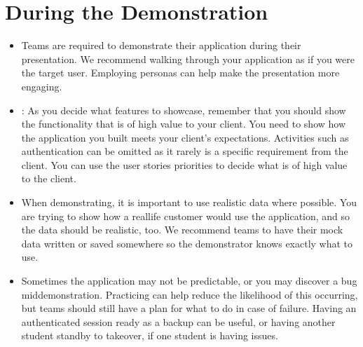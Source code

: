 \documentclass[letterpaper,10pt,english]{jupyterBook}
\begin{document}
\section{During the Demonstration}
\label{\detokenize{chapter_14/final_presentation:during-the-demonstration}}\begin{itemize}
\item {} 
\sphinxAtStartPar
{} Teams are
required to demonstrate their application during their presentation.
We recommend walking through your application as if you were the
target user. Employing personas can help make the presentation more
engaging.

\item {} 
\sphinxAtStartPar
{}: As you decide what features to
showcase, remember that you should show the functionality that is of
high value to your client. You need to show how the application you
built meets your client’s expectations. Activities such as
authentication can be omitted as it rarely is a specific requirement
from the client. You can use the user stories priorities to decide
what is of high value to the client.

\item {} 
\sphinxAtStartPar
{} When demonstrating, it is important to use
realistic data where possible. You are trying to show how a
real\sphinxhyphen{}life customer would use the application, and so the data should
be realistic, too. We recommend teams to have their mock data
written or saved somewhere so the demonstrator knows exactly what to
use.

\item {} 
\sphinxAtStartPar
{} Sometimes the application may not be
predictable, or you may discover a bug mid\sphinxhyphen{}demonstration. Practicing
can help reduce the likelihood of this occurring, but teams should
still have a plan for what to do in case of failure. Having an
authenticated session ready as a backup can be useful, or having
another student stand\sphinxhyphen{}by to take\sphinxhyphen{}over, if one student is having
issues.

\end{itemize}
\end{document}
